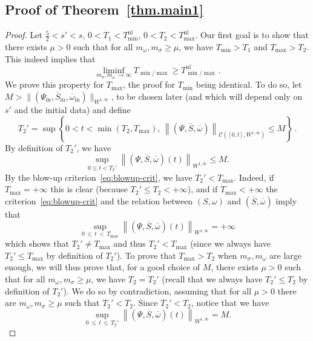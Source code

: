 \documentclass[AHL,Unicode,longabstracts,published]{cedram}
\newcommand{\rmin}{\mathrm{in}}
\newcommand{\nl}{\mathrm{nl}}
\newcommand{\cC}{\mathcal{C}}
\renewcommand\bar{\overline}
\newcommand\ii{{\ensuremath {\infty}}}
\begin{document}
\subsection*{Proof of Theorem~\ref{thm.main1}}

\begin{proof}
Let $\tfrac52 <s'<s$, $0<T_1<T_{\min}^{\nl}$, $0<T_2<T_{\max}^{\nl}$. Our first goal is to show that there exists $\mu>0$ such that for all $m_\omega,m_\sigma\geq \mu$, we have $T_{\min}>T_1$ and $T_{\max}>T_2$. This indeed implies that
\begin{equation*}
\liminf_{m_\sigma, m_\omega\,\to \infty}T_{\min/\max}\geq T_{\min/\max}^{\nl}\,.
\end{equation*}
We prove this property for $T_{\max}$, the proof for $T_{\min}$ being identical. To do so, let $M>\|(\Psi_\rmin, \overline{S}_\rmin, \overline{\omega}_\rmin)\|_{W^{1,\infty}}$, to be chosen later (and which will depend only on $s'$ and the initial data) and define
\[
T_2' = \sup\left\{0<t<\min(T_2,T_{\max}),\,\left\|(\Psi,\overline{S}, \overline{\omega})\right\|_{\cC\left([0,t], W^{1,\infty}\right)}\leq M\right\}\,.
\]
By definition of $T_2'$, we have
\begin{equation}\label{eq:bound-T2prime}
\sup_{0\leq t<T_2'}\left\|(\Psi,\overline{S}, \overline{\omega})(t)\right\|_{W^{1,\infty}}\leq M.
\end{equation}
By the blow-up criterion~\eqref{eq:blowup-crit}, we have $T_2'<T_{\max}$. Indeed, if $T_{\max}=+\ii$ this is clear (because $T_2'\leq T_2<+\ii$), and if $T_{\max}<+\ii$ the criterion~\eqref{eq:blowup-crit} and the relation between $(S,\omega)$ and $(\bar{S},\bar{\omega})$ imply that
\[
\sup_{0\,\leq\,t\,<\,T_{\max}}\left\|(\Psi,\overline{S}, \overline{\omega})(t)\right\|_{W^{1,\infty}}=+\ii
\]
which shows that $T_2'\neq T_{\max}$ and thus $T_2'<T_{\max}$ (since we always have $T_2'\leq T_{\max}$ by definition of $T_2'$). To prove that $T_{\max}>T_2$ when $m_\sigma,m_\omega$ are large enough, we will thus prove that, for a good choice of $M$, there exists $\mu>0$ such that for all $m_\omega,m_\sigma\geq \mu$, we have $T_2=T_2'$ (recall that we always have $T_2'\leq T_2$ by definition of $T_2'$). We do so by contradiction, assuming that for all $\mu>0$ there are $m_\omega,m_\sigma\geq\mu$ such that $T_2'<T_2$. Since $T_2'<T_2$, notice that we have
\begin{equation}\label{eq:bound-T2prime-2}
\sup_{0\,\leq \,t\,\leq \,T_2'} \left\|(\Psi,\overline{S}, \overline{\omega})(t)\right\|_{W^{1,\infty}}=M.
\end{equation}

\end{proof}
\end{document}
